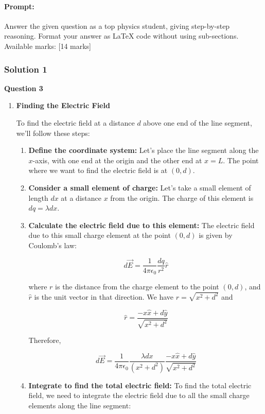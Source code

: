 \documentclass{article}
\begin{document}
\paragraph{Prompt: \\} 
Answer the given question as a top physics student, giving step-by-step reasoning. Format your answer as LaTeX code without using sub-sections. Available marks: [14 marks]

\subsubsection{Solution 1}
\textbf{Question 3}

\begin{enumerate}
\item \textbf{Finding the Electric Field}

To find the electric field at a distance \(d\) above one end of the line segment, we'll follow these steps:

\begin{enumerate}
\item \textbf{Define the coordinate system:}  Let's place the line segment along the \(x\)-axis, with one end at the origin and the other end at \(x=L\). The point where we want to find the electric field is at \((0,d)\).

\item \textbf{Consider a small element of charge:} Let's take a small element of length \(dx\) at a distance \(x\) from the origin. The charge of this element is \(dq = \lambda dx\).

\item \textbf{Calculate the electric field due to this element:} The electric field due to this small charge element at the point \((0,d)\) is given by Coulomb's law:
    
    \[d\vec{E} = \frac{1}{4\pi\epsilon_0} \frac{dq}{r^2} \hat{r}\]

    where \(r\) is the distance from the charge element to the point \((0,d)\), and \(\hat{r}\) is the unit vector in that direction. We have \(r = \sqrt{x^2 + d^2}\) and 
    
    \[\hat{r} = \frac{-x\hat{x} + d\hat{y}}{\sqrt{x^2 + d^2}}\]

    Therefore,
    
    \[d\vec{E} = \frac{1}{4\pi\epsilon_0} \frac{\lambda dx}{(x^2 + d^2)} \frac{-x\hat{x} + d\hat{y}}{\sqrt{x^2 + d^2}}\]

\item \textbf{Integrate to find the total electric field:} To find the total electric field, we need to integrate the electric field due to all the small charge elements along the line segment:


\end{enumerate}
\end{enumerate}
\end{document}
